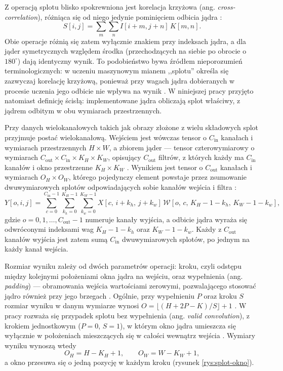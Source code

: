 \documentclass[a4paper,12pt]{book} %
\begin{document}
Z operacją splotu blisko spokrewniona jest korelacja krzyżowa (ang. \emph{cross-correlation}), różniąca się od niego jedynie pominięciem odbicia jądra \cite{oppenheim2010dtsp}:
\[
  S[i, j] = \sum_{m} \sum_{n} I[i + m, j + n]\, K[m, n].
\]
Obie operacje różnią się zatem wyłącznie znakiem przy indeksach jądra, a dla jąder symetrycznych względem środka (przechodzących na siebie po obrocie o $180^\circ$) dają identyczny wynik. To podobieństwo bywa źródłem nieporozumień terminologicznych: w uczeniu maszynowym mianem ,,splotu'' określa się zazwyczaj korelację krzyżową, ponieważ przy wagach jądra dobieranych w procesie uczenia jego odbicie nie wpływa na wynik \cite{goodfellow2016deeplearning}. W niniejszej pracy przyjęto natomiast definicję ścisłą: implementowane jądra obliczają splot właściwy, z jądrem odbitym w obu wymiarach przestrzennych.

Przy danych wielokanałowych takich jak obrazy złożone z wielu składowych splot przyjmuje postać wielokanałową. Wejściem jest wówczas tensor o $C_{\mathrm{in}}$ kanałach i wymiarach przestrzennych $H \times W$, a zbiorem jąder --- tensor czterowymiarowy o wymiarach $C_{\mathrm{out}} \times C_{\mathrm{in}} \times K_H \times K_W$, opisujący $C_{\mathrm{out}}$ filtrów, z których każdy ma $C_{\mathrm{in}}$ kanałów i okno przestrzenne $K_H \times K_W$ \cite{vasudevan2017mcmk}. Wynikiem jest tensor o $C_{\mathrm{out}}$ kanałach i wymiarach $O_H \times O_W$, którego pojedynczy element powstaje przez zsumowanie dwuwymiarowych splotów odpowiadających sobie kanałów wejścia i filtra \cite{vasudevan2017mcmk}:
\[
  Y[o, i, j] = \sum_{c=0}^{C_{\mathrm{in}}-1} \sum_{k_h=0}^{K_H-1} \sum_{k_w=0}^{K_W-1}
  X[c,\, i + k_h,\, j + k_w]\, \mathcal{W}[o,\, c,\, K_H - 1 - k_h,\, K_W - 1 - k_w],
\]
gdzie $o = 0, 1, \dots, C_{\mathrm{out}} - 1$ numeruje kanały wyjścia, a odbicie jądra wyraża się odwróconymi indeksami wag $K_H - 1 - k_h$ oraz $K_W - 1 - k_w$. Każdy z $C_{\mathrm{out}}$ kanałów wyjścia jest zatem sumą $C_{\mathrm{in}}$ dwuwymiarowych splotów, po jednym na każdy kanał wejścia.

Rozmiar wyniku zależy od dwóch parametrów operacji: kroku, czyli odstępu między kolejnymi położeniami okna jądra na wejściu, oraz wypełnienia (ang. \emph{padding}) --- obramowania wejścia wartościami zerowymi, pozwalającego stosować jądro również przy jego brzegach \cite{goodfellow2016deeplearning}. Ogólnie, przy wypełnieniu $P$ oraz kroku $S$ rozmiar wyniku w danym wymiarze wynosi $O = \lfloor (H + 2P - K)/S \rfloor + 1$ \cite{goodfellow2016deeplearning}. W pracy rozważa się przypadek splotu bez wypełnienia (ang. \emph{valid convolution}), z krokiem jednostkowym ($P = 0$, $S = 1$), w którym okno jądra umieszcza się wyłącznie w położeniach mieszczących się w całości wewnątrz wejścia \cite{vasudevan2017mcmk}. Wymiary wyniku wynoszą wtedy
\[
  O_H = H - K_H + 1, \qquad O_W = W - K_W + 1,
\]
a okno przesuwa się o jedną pozycję w każdym kroku (rysunek \ref{rys:splot-okno}).
\end{document}
